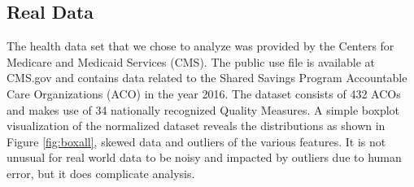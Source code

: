 \documentclass[conference]{IEEEtran}
\begin{document}

\subsection{Real Data}
The health data set that we chose to analyze was provided by the Centers for Medicare and Medicaid Services (CMS). The public use file is available at CMS.gov and contains data related to the Shared Savings Program Accountable Care Organizations (ACO) in the year 2016. The dataset consists of 432 ACOs and makes use of 34 nationally recognized Quality Measures.  A simple boxplot visualization of the normalized dataset reveals the distributions as shown in Figure \ref{fig:boxall}, skewed data and outliers of the various features. It is not unusual for real world data to be noisy and impacted by outliers due to human error, but it does complicate analysis.
\end{document}
